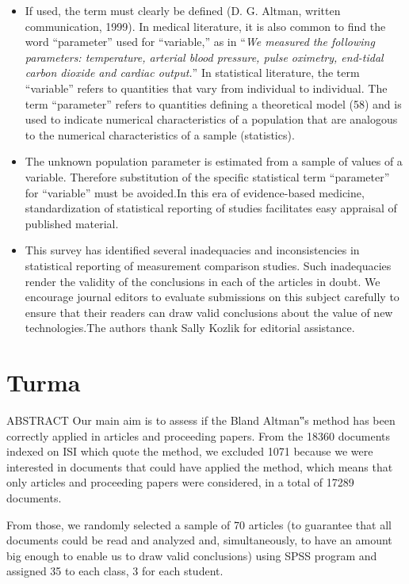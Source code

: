 \documentclass[MAIN.tex]{subfiles}
\begin{document}
\begin{itemize}
		\item If used, the term must clearly be defined (D. G. Altman, written communication, 1999). In medical literature, it is also common to find the word “parameter” used for “variable,” as in “\textit{We measured the following parameters: temperature, arterial blood pressure, pulse oximetry, end-tidal carbon dioxide and cardiac output.}” In statistical literature, the term “variable” refers to quantities that vary from individual to individual. The term “parameter” refers to quantities defining a theoretical model (58) and is used to indicate numerical characteristics of a population that are analogous to the numerical characteristics of a sample (statistics). 
		
		
		\item The unknown population parameter is estimated from a sample of values of a variable. Therefore substitution of the specific statistical term “parameter” for “variable” must be avoided.In this era of evidence-based medicine, standardization of statistical reporting of studies facilitates easy appraisal of published material. 
		
		\item This survey has identified several inadequacies and inconsistencies in statistical reporting of measurement comparison studies. Such inadequacies render the validity of the conclusions in each of the articles in doubt. We encourage journal editors to evaluate submissions on this subject carefully to ensure that their readers can draw valid conclusions about the value of new technologies.The authors thank Sally Kozlik for editorial assistance.
	\end{itemize}
	
\newpage
\section{Turma}


ABSTRACT
Our main aim is to assess if the Bland Altman‟s method has been correctly applied in articles and
proceeding papers. From the 18360 documents indexed on ISI which quote the method, we excluded
1071 because we were interested in documents that could have applied the method, which means
that only articles and proceeding papers were considered, in a total of 17289 documents. 


From those,
we randomly selected a sample of 70 articles (to guarantee that all documents could be read and
analyzed and, simultaneously, to have an amount big enough to enable us to draw valid conclusions)
using SPSS program and assigned 35 to each class, 3 for each student. 
\end{document}
